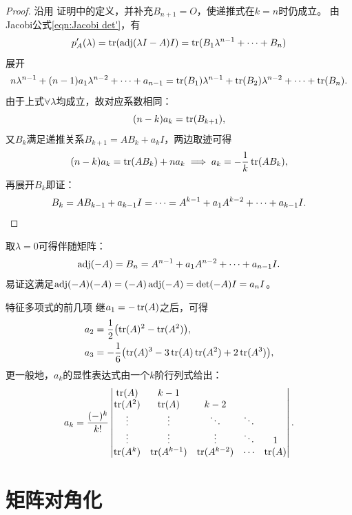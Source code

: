 \begin{proof}
	沿用 证明中的定义，并补充$B_{n+1} = O$，使递推式在$k = n$时仍成立。
	由Jacobi公式\eqref{eqn:Jacobi det'}，有 
	\[
		p_A'(\lambda) = \operatorname{tr}(\operatorname{adj}(\lambda I - A)I) = \operatorname{tr}(B_1\lambda^{n-1} + \cdots + B_n)
	\]
	展开
	\[
		n\lambda^{n-1} + (n - 1)a_1\lambda^{n-2} + \cdots + a_{n-1} = \operatorname{tr}(B_1)\lambda^{n-1} + \operatorname{tr}(B_2)\lambda^{n-2} + \cdots + \operatorname{tr}(B_n).
	\]
	由于上式$\forall\lambda$均成立，故对应系数相同：
	\[
		(n - k)a_k = \operatorname{tr}(B_{k+1}),
	\]
	又$B_k$满足递推关系$B_{k+1} = AB_k + a_kI$，两边取迹可得
	\[
		(n - k)a_k = \operatorname{tr}(AB_k) + na_k \implies a_k = -\frac1k\operatorname{tr}(AB_k),
	\]
	再展开$B_k$即证：
	\[
		B_k = AB_{k-1} + a_{k-1}I = \cdots = A^{k-1} + a_1A^{k-2} + \cdots + a_{k-1}I.
		\qedhere
	\]
\end{proof}

\begin{corollary}
	取$\lambda = 0$可得伴随矩阵：
	\begin{equation}
		\operatorname{adj}(-A) = B_n = A^{n-1} + a_1A^{n-2} + \cdots + a_{n-1}I.
	\end{equation}
	易证这满足$\operatorname{adj}(-A)(-A) = (-A)\operatorname{adj}(-A) = \det(-A)I = a_nI$。
\end{corollary}

\begin{example}
	{特征多项式的前几项}{}
	继$a_1 = -\operatorname{tr}(A)$之后，可得
	\begin{subequations}
		\begin{align}
			a_2 &= \frac12\bigl(\operatorname{tr}(A)^2 - \operatorname{tr}(A^2)\bigr),\\
			a_3 &= -\frac16\bigl(\operatorname{tr}(A)^3 - 3\operatorname{tr}(A)\operatorname{tr}(A^2) + 2\operatorname{tr}(A^3)\bigr),
		\end{align}
	\end{subequations}
	更一般地，$a_k$的显性表达式由一个$k$阶行列式给出：
	\begin{equation}
		a_k = \frac{(-)^k}{k!}\begin{vmatrix}
			\operatorname{tr}(A)&k - 1\\
			\operatorname{tr}(A^2)&\operatorname{tr}(A)&k - 2\\
			\vdots&\vdots&\ddots&\ddots\\
			\vdots&\vdots&\vdots&\ddots&1\\
			\operatorname{tr}(A^k)&\operatorname{tr}(A^{k-1})&\operatorname{tr}(A^{k-2})&\cdots&\operatorname{tr}(A)
		\end{vmatrix}.
	\end{equation}
\end{example}

\section{矩阵对角化}

